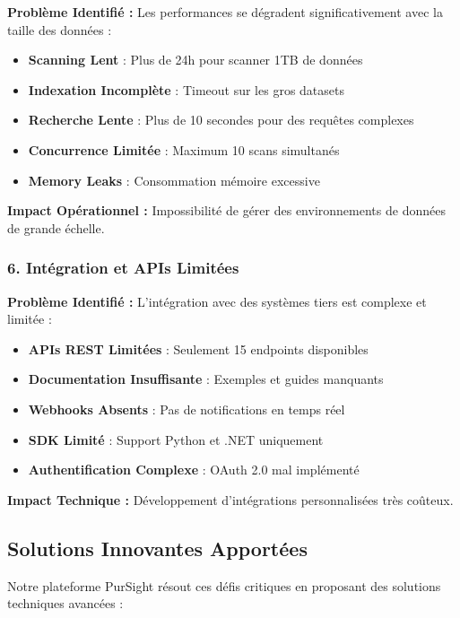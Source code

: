 \documentclass[12pt,a4paper]{article}
\begin{document}
\textbf{Problème Identifié :} Les performances se dégradent significativement avec la taille des données :

\begin{itemize}
    \item \textbf{Scanning Lent} : Plus de 24h pour scanner 1TB de données
    \item \textbf{Indexation Incomplète} : Timeout sur les gros datasets
    \item \textbf{Recherche Lente} : Plus de 10 secondes pour des requêtes complexes
    \item \textbf{Concurrence Limitée} : Maximum 10 scans simultanés
    \item \textbf{Memory Leaks} : Consommation mémoire excessive
\end{itemize}

\textbf{Impact Opérationnel :} Impossibilité de gérer des environnements de données de grande échelle.

\subsubsection{6. Intégration et APIs Limitées}

\textbf{Problème Identifié :} L'intégration avec des systèmes tiers est complexe et limitée :

\begin{itemize}
    \item \textbf{APIs REST Limitées} : Seulement 15 endpoints disponibles
    \item \textbf{Documentation Insuffisante} : Exemples et guides manquants
    \item \textbf{Webhooks Absents} : Pas de notifications en temps réel
    \item \textbf{SDK Limité} : Support Python et .NET uniquement
    \item \textbf{Authentification Complexe} : OAuth 2.0 mal implémenté
\end{itemize}

\textbf{Impact Technique :} Développement d'intégrations personnalisées très coûteux.

\subsection{Solutions Innovantes Apportées}

Notre plateforme PurSight résout ces défis critiques en proposant des solutions techniques avancées :
\end{document}
